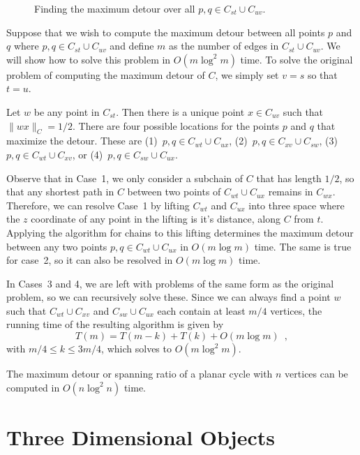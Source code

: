\documentclass[lotsofwhite]{patmorin}
\begin{document}
\begin{figure}
\caption{Finding the maximum detour over all $p,q\in C_{st}\cup C_{uv}$.}
\end{figure}

Suppose that we wish to compute the maximum detour between all points
$p$ and $q$ where $p,q\in C_{st}\cup C_{uv}$ and define $m$ as the
number of edges in $C_{st}\cup C_{uv}$.  We will show how to solve
this problem in $O(m\log^2 m)$ time.  To solve the original problem of
computing the maximum detour of $C$, we simply set $v=s$ so that
$t=u$.

Let $w$ be any point in $C_{st}$.  Then there is a unique point $x\in
C_{uv}$ such that $\|wx\|_C=1/2$.  There are four possible locations
for the points $p$ and $q$ that maximize the detour. These are
(1)~$p,q\in C_{wt}\cup C_{ux}$, (2)~$p,q\in C_{xv}\cup C_{sw}$,
(3)~$p,q\in C_{wt}\cup C_{xv}$, or (4)~$p,q\in C_{sw}\cup C_{ux}$.

Observe that in Case~1, we only consider a subchain of $C$ that has
length $1/2$, so that any shortest path in $C$ between two points of
$C_{wt}\cup C_{ux}$ remains in $C_{wx}$.  Therefore, we can resolve
Case~1 by lifting $C_{wt}$ and $C_{ux}$ into three space where the $z$
coordinate of any point in the lifting is it's distance, along $C$
from $t$.  Applying the algorithm for chains to this lifting
determines the maximum detour between any two points $p,q\in
C_{wt}\cup C_{ux}$ in $O(m\log m)$ time.  The same is true for case~2,
so it can also be resolved in $O(m\log m)$ time.

In Cases~3 and 4, we are left with problems of the same form as the
original problem, so we can recursively solve these.  Since we can
always find a point $w$ such that $C_{wt}\cup C_{xv}$ and $C_{sw}\cup
C_{ux}$ each contain at least $m/4$ vertices, the running time of the
resulting algorithm is given by
\[
 T(m) = T(m-k) + T(k) + O(m\log m) \enspace ,
\] 
with $m/4\le k\le 3m/4$, which solves to $O(m\log^2 m)$.

\begin{thm}
The maximum detour or spanning ratio of a planar cycle with $n$
vertices can be computed in $O(n\log^2 n)$ time.
\end{thm}

\section{Three Dimensional Objects}
\end{document}
